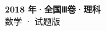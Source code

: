 \documentclass[zihao=-4, a4paper]{ctexart}
\begin{document}
\begin{center}
  {\Large\bfseries 2018 年·全国Ⅲ卷·理科}\\[4pt]
  {\large 数学 · 试题版}
\end{center}
\medskip
{}

\end{document}
